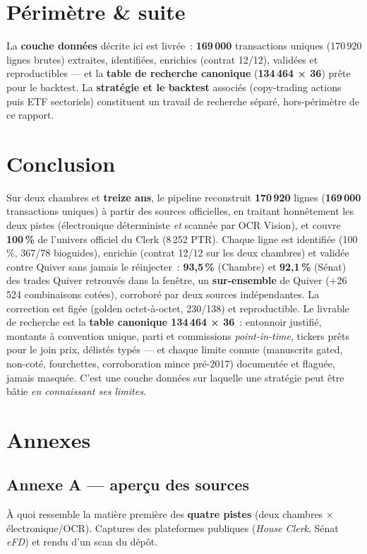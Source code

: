 \documentclass[11pt,a4paper]{article}
\begin{document}
\section{Périmètre \& suite}
La \textbf{couche données} décrite ici est livrée~: \textbf{169\,000} transactions uniques (170\,920
lignes brutes) extraites, identifiées, enrichies (contrat 12/12), validées et reproductibles — et la
\textbf{table de recherche canonique} (\textbf{134\,464 × 36}) prête pour le backtest. La \textbf{stratégie
et le backtest} associés (copy-trading actions puis ETF sectoriels) constituent un travail de recherche
séparé, hors-périmètre de ce rapport.

\section{Conclusion}
Sur deux chambres et \textbf{treize ans}, le pipeline reconstruit \textbf{170\,920} lignes
(\textbf{169\,000} transactions uniques) à partir des sources officielles, en traitant honnêtement les deux
pistes (électronique déterministe \emph{et} scannée par OCR Vision), et couvre \textbf{100\,\%} de
l'univers officiel du Clerk (8\,252 PTR). Chaque ligne est identifiée (100\,\%, 367/78 bioguides), enrichie
(contrat 12/12 sur les deux chambres) et validée contre Quiver sans jamais le réinjecter~: \textbf{93,5\,\%}
(Chambre) et \textbf{92,1\,\%} (Sénat) des trades Quiver retrouvés dans la fenêtre, un \textbf{sur-ensemble}
de Quiver (+26\,524 combinaisons cotées), corroboré par deux sources indépendantes. La correction est figée
(golden octet-à-octet, 230/138) et reproductible. Le livrable de recherche est la \textbf{table canonique
134\,464 × 36}~: entonnoir justifié, montants à convention unique, parti et commissions
\emph{point-in-time}, tickers prêts pour le join prix, délistés typés — et chaque limite connue (manuscrits
gated, non-coté, fourchettes, corroboration mince pré-2017) documentée et flaguée, jamais masquée. C'est une
couche données sur laquelle une stratégie peut être bâtie \emph{en connaissant ses limites}.

\clearpage
\section{Annexes}

\subsection{Annexe A — aperçu des sources}
\label{anx:sources}
À quoi ressemble la matière première des \textbf{quatre pistes} (deux chambres × électronique/OCR).
Captures des plateformes publiques (\emph{House Clerk}, Sénat \emph{eFD}) et rendu d'un scan du dépôt.
\end{document}
